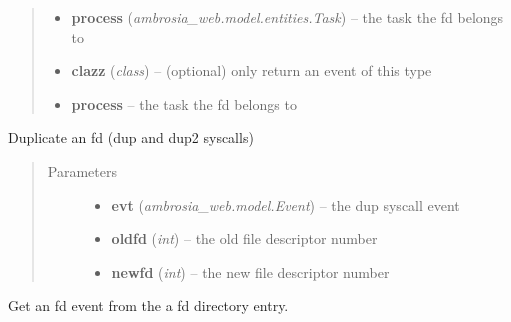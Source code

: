 \documentclass[letterpaper,10pt,english]{sphinxmanual}
\begin{document}
\begin{fulllineitems}
\begin{fulllineitems}
\begin{quote}
\begin{description}
\begin{itemize}
\item {} 
\textbf{process} (\emph{ambrosia\_web.model.entities.Task}) -- the task the fd belongs to

\item {} 
\textbf{clazz} (\emph{class}) -- (optional) only return an event of this type

\item {} 
\textbf{process} -- the task the fd belongs to

\end{itemize}

\end{description}\end{quote}

\end{fulllineitems}


\begin{fulllineitems}
\label{ambrosia_plugins.lkm:ambrosia_plugins.lkm.SyscallCorrelator._get_dup}
Duplicate an fd (dup and dup2 syscalls)
\begin{quote}\begin{description}
\item[{Parameters}] \leavevmode\begin{itemize}
\item {} 
\textbf{evt} (\emph{ambrosia\_web.model.Event}) -- the dup syscall event

\item {} 
\textbf{oldfd} (\emph{int}) -- the old file descriptor number

\item {} 
\textbf{newfd} (\emph{int}) -- the new file descriptor number

\end{itemize}

\end{description}\end{quote}

\end{fulllineitems}


\begin{fulllineitems}
\label{ambrosia_plugins.lkm:ambrosia_plugins.lkm.SyscallCorrelator._get_fd_event}
Get an fd event from the a fd directory entry.


\end{fulllineitems}
\end{fulllineitems}
\end{document}
